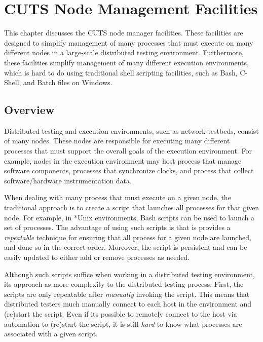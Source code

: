 
\chapter{CUTS Node Management Facilities}
\label{chap:node}

This chapter discusses the CUTS node manager facilities. These
facilities are designed to simplify management of many processes
that must execute on many different nodes in a large-scale distributed
testing environment. Furthermore, these facilities simplify management
of many different execution environments, which is hard to do using 
traditional shell scripting facilities, such as Bash, C-Shell, and
Batch files on Windows.

\section{Overview}
\label{sec:node-overview}

Distributed testing and execution environments, such as network 
testbeds, consist of many nodes. These nodes are responsible for 
executing many different processes that must support the overall
goals of the execution environment. For example, nodes in the 
execution environment may host process that manage software components,  
processes that synchronize clocks, and process that collect
software/hardware instrumentation data.

When dealing with many process that must execute on a given node,
the traditional approach is to create a script that launches all
processes for that given node. For example, in *Unix environments,
Bash scripts can be used to launch a set of processes. The advantage
of using such scripts is that is provides a \textit{repeatable}
technique for ensuring that all process for a given node are launched,
and done so in the correct order. Moreover, the script is persistent
and can be easily updated to either add or remove processes as needed.

Although such scripts suffice when working in a distributed 
testing environment, its approach as more complexity to the 
distributed testing process. First, the scripts are only repeatable
after \textit{manually} invoking the script. This means that 
distributed testers much manually connect to each host in the 
environment and (re)start the script. Even if its possible to 
remotely connect to the host via automation to (re)start the 
script, it is still \textit{hard} to know what processes are
associated with a given script.

